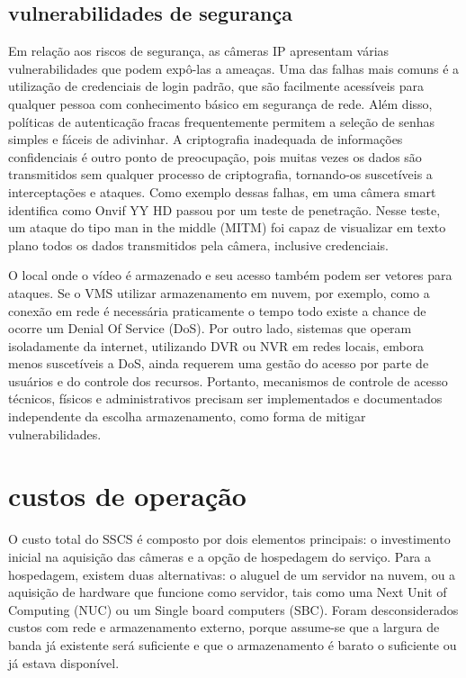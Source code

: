 \documentclass[12pt, %
openright, 
oneside, %
a4paper,    %
brazil]{facom-ufu-abntex2}
\begin{document}
\subsection{vulnerabilidades de segurança}

Em relação aos riscos de segurança, as câmeras IP apresentam várias
vulnerabilidades que podem expô-las a ameaças. Uma das falhas mais comuns é a
utilização de credenciais de login padrão, que são facilmente acessíveis para
qualquer pessoa com conhecimento básico em segurança de rede. Além disso,
políticas de autenticação fracas frequentemente permitem a seleção de senhas
simples e fáceis de adivinhar. A criptografia inadequada de informações
confidenciais é outro ponto de preocupação, pois muitas vezes os dados são
transmitidos sem qualquer processo de criptografia, tornando-os suscetíveis a
interceptações e ataques. Como exemplo dessas falhas, em 
uma câmera smart identifica como Onvif YY HD passou por um teste de penetração.
Nesse teste, um ataque do tipo man in the middle (MITM) foi capaz de visualizar
em texto plano todos os dados transmitidos pela câmera, inclusive credenciais.

O local onde o vídeo é armazenado e seu acesso também podem ser vetores para
ataques. Se o VMS utilizar armazenamento em nuvem, por exemplo, como a conexão
em rede é necessária praticamente o tempo todo existe a chance de ocorre um
Denial Of Service (DoS). Por outro lado, sistemas que operam isoladamente da
internet, utilizando DVR ou NVR em redes locais, embora menos suscetíveis a
DoS, ainda requerem uma gestão do acesso por parte de usuários e do controle
dos recursos. Portanto, mecanismos de controle de acesso técnicos, físicos e
administrativos precisam ser implementados e documentados independente da
escolha armazenamento, como forma de mitigar vulnerabilidades.

\section{custos de operação}

O custo total do SSCS é composto por dois elementos principais: o investimento
inicial na aquisição das câmeras e a opção de hospedagem do serviço. Para a
hospedagem, existem duas alternativas: o aluguel de um servidor na nuvem, ou a
aquisição de hardware que funcione como servidor, tais como uma Next Unit of
Computing (NUC) ou um Single board computers (SBC). Foram desconsiderados
custos com rede e armazenamento externo, porque assume-se que a largura de
banda já existente será suficiente e que o armazenamento é barato o suficiente
ou já estava disponível.
\end{document}
